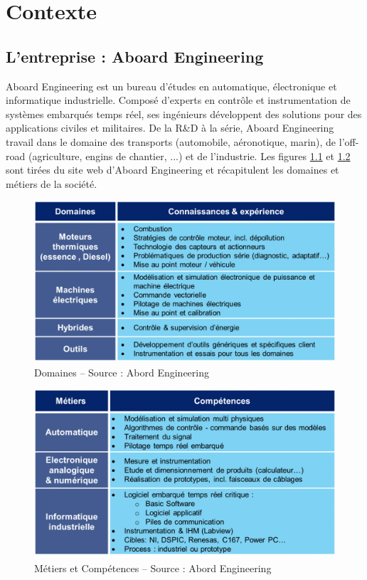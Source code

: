 \chapter{Contexte}
\section{L'entreprise : Aboard Engineering}
Aboard Engineering est un bureau d'études en automatique, électronique et informatique industrielle. Composé d'experts en contrôle et instrumentation de systèmes embarqués temps réel, ses ingénieurs développent des solutions pour des applications civiles et militaires. De la R\&D à la série, Aboard Engineering travail dans le domaine des transports (automobile, aéronotique, marin), de l'off-road (agriculture, engins de chantier, ...) et de l'industrie. Les figures \ref{fig:domaines} et  \ref{fig:metiers} sont tirées du site web d'Aboard Engineering et récapitulent les domaines et métiers de la société.

\begin{figure}[h]
	\center
	\includegraphics[scale=0.4]{images/domaines}
	\caption{Domaines -- Source : Abord Engineering}
	\label{fig:domaines}
\end{figure}

\begin{figure}[h]
	\center
	\includegraphics[scale=0.4]{images/metiers}
	\caption{Métiers et Compétences -- Source : Abord Engineering}
	\label{fig:metiers}
\end{figure}

